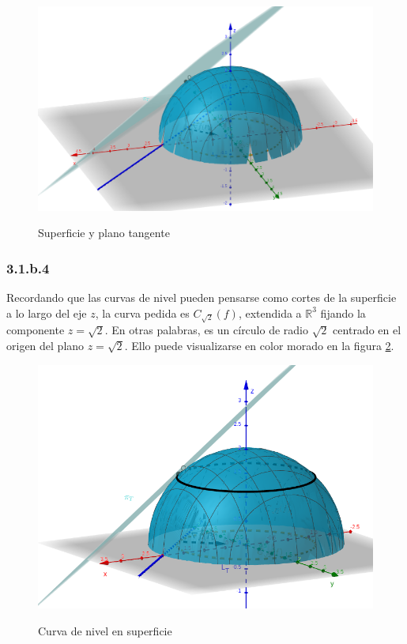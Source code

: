 \documentclass{article}
\renewcommand{\Bbb}{\mathbb}
\begin{document}
\begin{figure}[ht]
\caption{Superficie y plano tangente}
\includegraphics[scale=0.35]{img/ejercicios/3/1-b-3.png} 
\centering
\label{fig:1-b-3}
\end{figure}

\subsubsection*{3.1.b.4}
\label{subsubsec:3.1.b.4}

Recordando que las curvas de nivel pueden pensarse como cortes de la superficie a lo largo del eje $z$, la curva pedida es $C_{\sqrt{2}}(f)$, extendida a $\Bbb R^3$ fijando la componente $z = \sqrt{2}$. En otras palabras, es un círculo de radio $\sqrt{2}$ centrado en el origen del plano $z = \sqrt{2}$. Ello puede visualizarse en color morado en la figura \ref{fig:1-b-4}.

\begin{figure}[ht]
\caption{Curva de nivel en superficie}
\includegraphics[scale=0.35]{img/ejercicios/3/1-b-4.png} 
\centering
\label{fig:1-b-4}
\end{figure}
\end{document}
